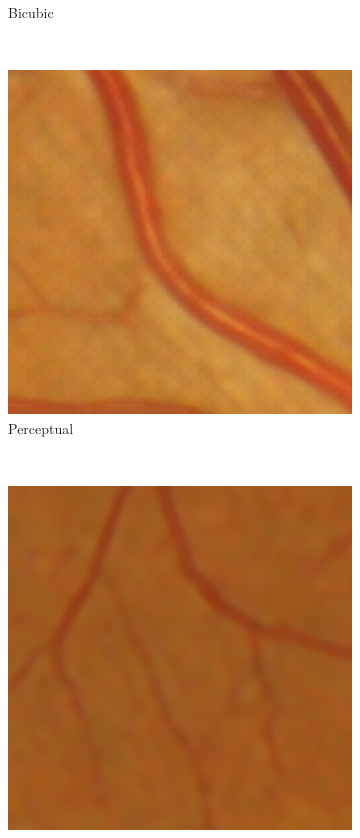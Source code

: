 \documentclass{scrartcl}
\begin{document}
\begin{figure}[h]
{\begin{subfigure}{0.2\textwidth}
    \caption{Bicubic}
\end{subfigure}~
\begin{subfigure}{0.2\textwidth}
\centering
    \includegraphics[width=1.0\textwidth]{patch_sr1_sal_perc_small}
    \caption{Perceptual}
\end{subfigure}~
\begin{subfigure}{0.2\textwidth}
\centering
    \includegraphics[width=1.0\textwidth]{patch_sr1_sal_small}

\end{subfigure}}
\end{figure}
\end{document}
